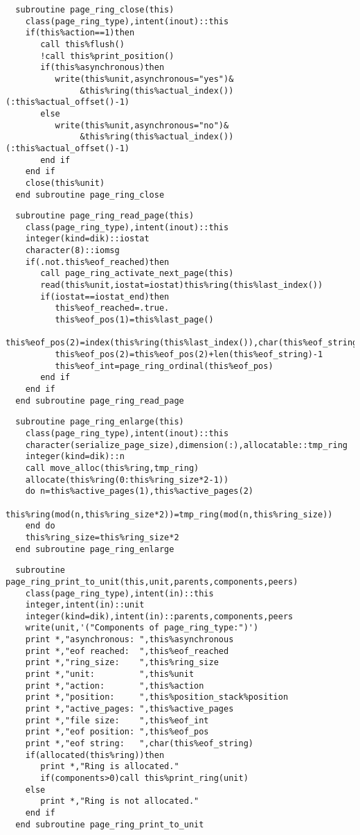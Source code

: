 \begin{Verbatim}
  subroutine page_ring_close(this)
    class(page_ring_type),intent(inout)::this
    if(this%action==1)then
       call this%flush()
       !call this%print_position()
       if(this%asynchronous)then
          write(this%unit,asynchronous="yes")&
               &this%ring(this%actual_index())(:this%actual_offset()-1)
       else
          write(this%unit,asynchronous="no")&
               &this%ring(this%actual_index())(:this%actual_offset()-1)
       end if
    end if
    close(this%unit)
  end subroutine page_ring_close
\end{Verbatim}

\begin{Verbatim}
  subroutine page_ring_read_page(this)
    class(page_ring_type),intent(inout)::this
    integer(kind=dik)::iostat
    character(8)::iomsg
    if(.not.this%eof_reached)then
       call page_ring_activate_next_page(this)
       read(this%unit,iostat=iostat)this%ring(this%last_index())
       if(iostat==iostat_end)then
          this%eof_reached=.true.
          this%eof_pos(1)=this%last_page()
          this%eof_pos(2)=index(this%ring(this%last_index()),char(this%eof_string))
          this%eof_pos(2)=this%eof_pos(2)+len(this%eof_string)-1
          this%eof_int=page_ring_ordinal(this%eof_pos)
       end if
    end if
  end subroutine page_ring_read_page
\end{Verbatim}

\begin{Verbatim}
  subroutine page_ring_enlarge(this)
    class(page_ring_type),intent(inout)::this
    character(serialize_page_size),dimension(:),allocatable::tmp_ring
    integer(kind=dik)::n
    call move_alloc(this%ring,tmp_ring)
    allocate(this%ring(0:this%ring_size*2-1))
    do n=this%active_pages(1),this%active_pages(2)
       this%ring(mod(n,this%ring_size*2))=tmp_ring(mod(n,this%ring_size))
    end do
    this%ring_size=this%ring_size*2
  end subroutine page_ring_enlarge
\end{Verbatim}
  
\begin{Verbatim}
  subroutine page_ring_print_to_unit(this,unit,parents,components,peers)
    class(page_ring_type),intent(in)::this
    integer,intent(in)::unit
    integer(kind=dik),intent(in)::parents,components,peers
    write(unit,'("Components of page_ring_type:")')
    print *,"asynchronous: ",this%asynchronous
    print *,"eof reached:  ",this%eof_reached
    print *,"ring_size:    ",this%ring_size
    print *,"unit:         ",this%unit
    print *,"action:       ",this%action
    print *,"position:     ",this%position_stack%position
    print *,"active_pages: ",this%active_pages
    print *,"file size:    ",this%eof_int
    print *,"eof position: ",this%eof_pos
    print *,"eof string:   ",char(this%eof_string)
    if(allocated(this%ring))then
       print *,"Ring is allocated."
       if(components>0)call this%print_ring(unit)
    else
       print *,"Ring is not allocated."
    end if
  end subroutine page_ring_print_to_unit
\end{Verbatim}
  
